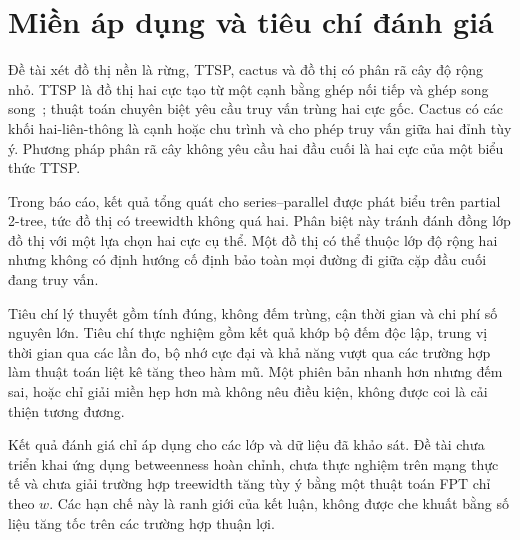 \section{Miền áp dụng và tiêu chí đánh giá}

Đề tài xét đồ thị nền là rừng, TTSP, cactus và đồ thị có phân rã cây độ rộng nhỏ. TTSP là đồ thị hai cực tạo từ một cạnh bằng ghép nối tiếp và ghép song song~\cite{eppstein1992}; thuật toán chuyên biệt yêu cầu truy vấn trùng hai cực gốc. Cactus có các khối hai-liên-thông là cạnh hoặc chu trình và cho phép truy vấn giữa hai đỉnh tùy ý. Phương pháp phân rã cây không yêu cầu hai đầu cuối là hai cực của một biểu thức TTSP.

Trong báo cáo, kết quả tổng quát cho series--parallel được phát biểu trên partial 2-tree, tức đồ thị có treewidth không quá hai. Phân biệt này tránh đánh đồng lớp đồ thị với một lựa chọn hai cực cụ thể. Một đồ thị có thể thuộc lớp độ rộng hai nhưng không có định hướng cố định bảo toàn mọi đường đi giữa cặp đầu cuối đang truy vấn.

Tiêu chí lý thuyết gồm tính đúng, không đếm trùng, cận thời gian và chi phí số nguyên lớn. Tiêu chí thực nghiệm gồm kết quả khớp bộ đếm độc lập, trung vị thời gian qua các lần đo, bộ nhớ cực đại và khả năng vượt qua các trường hợp làm thuật toán liệt kê tăng theo hàm mũ. Một phiên bản nhanh hơn nhưng đếm sai, hoặc chỉ giải miền hẹp hơn mà không nêu điều kiện, không được coi là cải thiện tương đương.

Kết quả đánh giá chỉ áp dụng cho các lớp và dữ liệu đã khảo sát. Đề tài chưa triển khai ứng dụng betweenness hoàn chỉnh, chưa thực nghiệm trên mạng thực tế và chưa giải trường hợp treewidth tăng tùy ý bằng một thuật toán FPT chỉ theo $w$. Các hạn chế này là ranh giới của kết luận, không được che khuất bằng số liệu tăng tốc trên các trường hợp thuận lợi.
